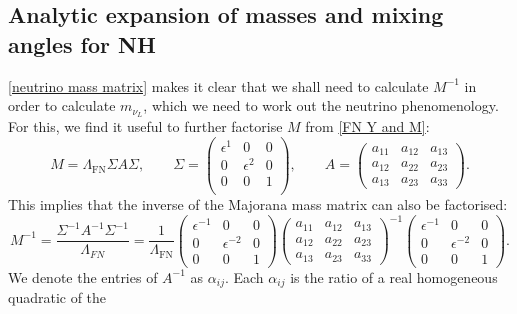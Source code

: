 \documentclass[11pt,letterpaper]{article}
\begin{document}
\subsection{Analytic expansion of masses and mixing angles for NH} \label{sec:anal}
\cref{neutrino mass matrix} makes it clear that we shall need to calculate $M^{-1}$ in order to calculate $m_{\nu_L}$, which we need to work out the neutrino phenomenology.
For this, we find it useful to further factorise $M$ from \cref{FN Y and M}:
\begin{equation} \label{eqn:MajoranaMatrixFact}
M = \Lambda_{\text{FN}} \Sigma A \Sigma, \qquad 
    \Sigma = \begin{pmatrix}
    \epsilon^{1} & 0 & 0 \\
     0 & \epsilon^2 & 0 \\
     0 & 0 & 1 \\
    \end{pmatrix}, \qquad
A =     \begin{pmatrix}
        a_{11} & a_{12}  & a_{13} \\
        a_{12} & a_{22}  & a_{23} \\
        a_{13} & a_{23} & a_{33} 
    \end{pmatrix}.
\end{equation}
This implies that the inverse of the Majorana mass matrix can also be factorised:
\begin{equation}
     M^{-1} =\frac{\Sigma^{-1} A^{-1} \Sigma^{-1}}{\Lambda_{FN}} = \frac{1}{\Lambda_{\text{FN}} }\begin{pmatrix}
     \epsilon ^{-1} & 0 & 0 \\ 
     0 & \epsilon ^{-2} & 0 \\ 
     0 & 0 & 1 
     \end{pmatrix}
     \begin{pmatrix}
        a_{11} & a_{12}  & a_{13} \\
        a_{12} & a_{22}  & a_{23} \\
        a_{13} & a_{23} & a_{33} 
    \end{pmatrix}^{-1}
    \begin{pmatrix}
     \epsilon ^{-1} & 0 & 0 \\ 
     0 & \epsilon ^{-2} & 0 \\ 
     0 & 0 & 1 
     \end{pmatrix}.
\end{equation}
We denote the entries of $A^{-1}$ as $\alpha_{ij}$. 
Each $\alpha_{ij}$ is the ratio of a real homogeneous quadratic of the
\end{document}
